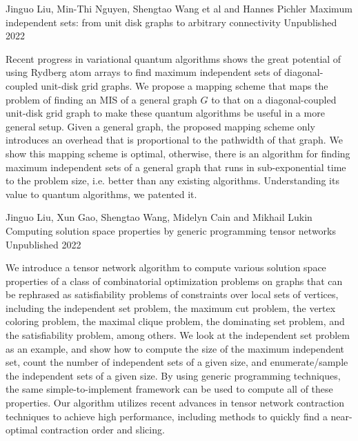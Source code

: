 \documentclass[11pt, a4paper]{awesome-cv}
\begin{document}
%
%
\begin{cventries}
  \cventry
    {Jinguo Liu, Min-Thi Nguyen, Shengtao Wang et al and Hannes Pichler} %
    {Maximum independent sets: from unit disk graphs to arbitrary connectivity} %
    {Unpublished} %
    {2022} %
    {
      \begin{cvitems} %
        {
    Recent progress in variational quantum algorithms shows the great potential of using Rydberg atom arrays to find maximum independent sets of diagonal-coupled unit-disk grid graphs.
    We propose a mapping scheme that maps the problem of finding an MIS of a general graph $G$ to that on a diagonal-coupled unit-disk grid graph to make these quantum algorithms be useful in a more general setup.
    Given a general graph, the proposed mapping scheme only introduces an overhead that is proportional to the pathwidth of that graph.
    We show this mapping scheme is optimal, otherwise, there is an algorithm for finding maximum independent sets of a general graph that runs in sub-exponential time to the problem size, i.e. better than any existing algorithms.
    Understanding its value to quantum algorithms, we patented it.
}
      \end{cvitems}
    }
  \cventry
    {Jinguo Liu, Xun Gao, Shengtao Wang, Midelyn Cain and Mikhail Lukin} %
    {Computing solution space properties by generic programming tensor networks} %
    {Unpublished} %
    {2022} %
    {
      \begin{cvitems} %
      {We introduce a tensor network algorithm %
to compute various solution space properties of a class of combinatorial optimization problems on graphs that can be rephrased as satisfiability problems of constraints over local sets of vertices, including the independent set problem, the maximum cut problem, the vertex coloring problem, the maximal clique problem, the dominating set problem, and the satisfiability problem, among others.
We look at the independent set problem as an example, and show how to compute the size of the maximum independent set, count the number of independent sets of a given size, and enumerate/sample the independent sets of a given size.
By using generic programming techniques, %
the same simple-to-implement framework can be used to compute all of these properties. Our algorithm utilizes recent advances in tensor network contraction techniques to achieve high performance, including methods to quickly find a near-optimal contraction order and slicing.
}
\end{cvitems}}
\end{cventries}
\end{document}
